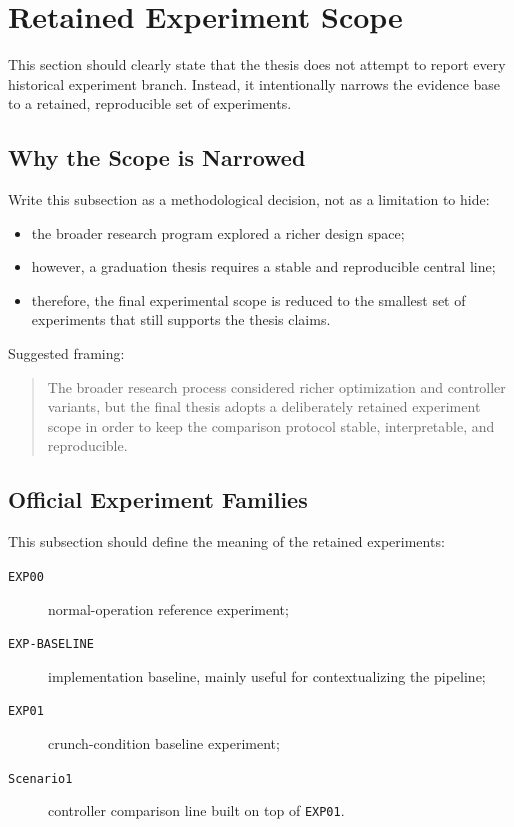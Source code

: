 \section{Retained Experiment Scope}

This section should clearly state that the thesis does not attempt to report every historical experiment branch. Instead, it intentionally narrows the evidence base to a retained, reproducible set of experiments.

\subsection{Why the Scope is Narrowed}

Write this subsection as a methodological decision, not as a limitation to hide:
\begin{itemize}
    \item the broader research program explored a richer design space;
    \item however, a graduation thesis requires a stable and reproducible central line;
    \item therefore, the final experimental scope is reduced to the smallest set of experiments that still supports the thesis claims.
\end{itemize}

\noindent Suggested framing:
\begin{quote}
The broader research process considered richer optimization and controller variants, but the final thesis adopts a deliberately retained experiment scope in order to keep the comparison protocol stable, interpretable, and reproducible.
\end{quote}

\subsection{Official Experiment Families}

This subsection should define the meaning of the retained experiments:
\begin{description}
    \item[\texttt{EXP00}] normal-operation reference experiment;
    \item[\texttt{EXP-BASELINE}] implementation baseline, mainly useful for contextualizing the pipeline;
    \item[\texttt{EXP01}] crunch-condition baseline experiment;
    \item[\texttt{Scenario1}] controller comparison line built on top of \texttt{EXP01}.
\end{description}

